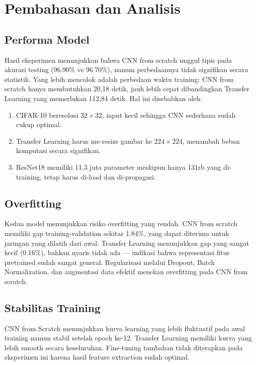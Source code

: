 \documentclass[conference]{IEEEtran}
\begin{document}
\section{Pembahasan dan Analisis}
\subsection{Performa Model}
Hasil eksperimen menunjukkan bahwa CNN from scratch unggul tipis pada akurasi testing (96.90\% vs 96.70\%), namun perbedaannya tidak signifikan secara statistik. Yang lebih mencolok adalah perbedaan waktu training: CNN from scratch hanya membutuhkan 20,18 detik, jauh lebih cepat dibandingkan Transfer Learning yang memerlukan 112,84 detik. Hal ini disebabkan oleh:
\begin{enumerate}
\item CIFAR-10 beresolusi $32\times32$, input kecil sehingga CNN sederhana sudah cukup optimal.
\item Transfer Learning harus me-resize gambar ke $224\times224$, menambah beban komputasi secara signifikan.
\item ResNet18 memiliki 11,3 juta parameter meskipun hanya 131rb yang di-training, tetap harus di-load dan di-propagasi.
\end{enumerate}

\subsection{Overfitting}
Kedua model menunjukkan risiko overfitting yang rendah. CNN from scratch memiliki gap training-validation sekitar 1.84\%, yang dapat diterima untuk jaringan yang dilatih dari awal. Transfer Learning menunjukkan gap yang sangat kecil (0.16\%), bahkan nyaris tidak ada — indikasi bahwa representasi fitur pretrained sudah sangat general. Regularisasi melalui Dropout, Batch Normalization, dan augmentasi data efektif menekan overfitting pada CNN from scratch.

\subsection{Stabilitas Training}
CNN from Scratch menunjukkan kurva learning yang lebih fluktuatif pada awal training namun stabil setelah epoch ke-12. Transfer Learning memiliki kurva yang lebih smooth secara keseluruhan. Fine-tuning tambahan tidak diterapkan pada eksperimen ini karena hasil feature extraction sudah optimal.
\end{document}
